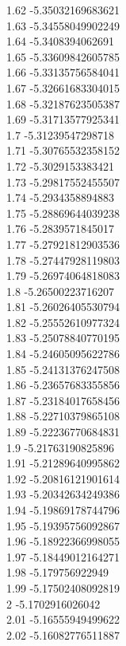 {1.62	-5.35032169683621\\
1.63	-5.34558049902249\\
1.64	-5.3408394062691\\
1.65	-5.33609842605785\\
1.66	-5.33135756584041\\
1.67	-5.32661683304015\\
1.68	-5.32187623505387\\
1.69	-5.31713577925341\\
1.7	-5.31239547298718\\
1.71	-5.30765532358152\\
1.72	-5.3029153383421\\
1.73	-5.29817552455507\\
1.74	-5.2934358894883\\
1.75	-5.28869644039238\\
1.76	-5.2839571845017\\
1.77	-5.27921812903536\\
1.78	-5.27447928119803\\
1.79	-5.26974064818083\\
1.8	-5.26500223716207\\
1.81	-5.26026405530794\\
1.82	-5.25552610977324\\
1.83	-5.25078840770195\\
1.84	-5.24605095622786\\
1.85	-5.24131376247508\\
1.86	-5.23657683355856\\
1.87	-5.23184017658456\\
1.88	-5.22710379865108\\
1.89	-5.22236770684831\\
1.9	-5.21763190825896\\
1.91	-5.21289640995862\\
1.92	-5.20816121901614\\
1.93	-5.20342634249386\\
1.94	-5.19869178744796\\
1.95	-5.19395756092867\\
1.96	-5.18922366998055\\
1.97	-5.18449012164271\\
1.98	-5.179756922949\\
1.99	-5.17502408092819\\
2	-5.1702916026042\\
2.01	-5.16555949499622\\
2.02	-5.16082776511887\\
}
